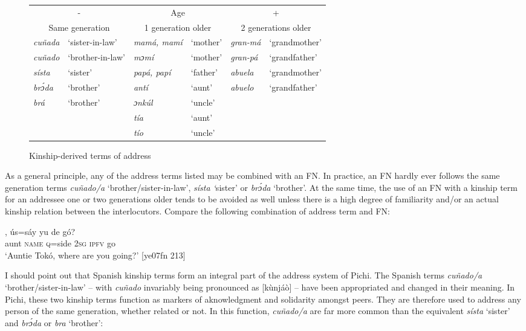 \begin{figure}
\caption{Kinship-derived terms of address}
\label{fig:key:12.2}
\small
\begin{tabularx}{\textwidth}{llllll}

\multicolumn{2}{c}{{}-} & \multicolumn{2}{c}{Age} & \multicolumn{2}{c}{+}\\
\multicolumn{2}{c}{Same generation} & \multicolumn{2}{c}{1 generation older} & \multicolumn{2}{c}{2 generations older}\\
\midrule 
\itshape cuñada & ‘sister-in-law’ & \itshape mamá, mamí & ‘mother’ & \itshape gran-má & ‘grandmother’\\
\itshape cuñado & ‘brother-in-law’ & \itshape mɔmí & ‘mother’ & \itshape gran-pá & ‘grandfather’\\
\itshape sísta & ‘sister’ & \itshape papá, papí & ‘father’ & \itshape abuela & ‘grandmother’\\
\itshape brɔ́da & ‘brother’ & \itshape antí & ‘aunt’ & \itshape abuelo & ‘grandfather’\\
\itshape brá & ‘brother’ & \itshape ɔnkúl & ‘uncle’ &  & \\
&  & \itshape tía & ‘aunt’ &  & \\
&  & \itshape tío & ‘uncle’ &  & \\
\end{tabularx}
\end{figure}
As a general principle, any of the address terms listed may be combined with an FN. In practice, an FN hardly ever follows the same generation terms \textit{cuñado}\textit{\textup{/}}\textit{a} ‘brother/sister-in-law’, \textit{sísta ‘}sister’ or \textit{brɔ́da} ‘brother’. At the same time, the use of an FN with a kinship term for an addressee one or two generations older tends to be avoided as well unless there is a high degree of familiarity and/or an actual kinship relation between the interlocutors. Compare the following combination of address term and FN:


\ea%
    \label{ex:key:1677}
    \gll {}    ,  ús=sáy  yu  de  gó?\\
aunt    \textsc{name}  \textsc{q}=side  \textsc{2sg}  \textsc{ipfv}  go\\

\glt ‘Auntie Tokó, where are you going?’ [ye07fn 213]
\z

I should point out that Spanish kinship terms form an integral part of the address system of Pichi. The Spanish terms \textit{cuñado}\textit{\textup{/}}\textit{a} ‘brother/sister-in-law’ – with \textit{cuñado} invariably being pronounced as [kùnjáò] – have been appropriated and changed in their meaning. In Pichi, these two kinship terms function as markers of aknowledgment and solidarity amongst peers. They are therefore used to address any person of the same generation, whether related or not. In this function, \textit{cuñado}\textit{\textup{/}}\textit{a} are far more common than the equivalent \textit{sísta} ‘sister’ and \textit{brɔ́da} or \textit{bra} ‘brother’: 



